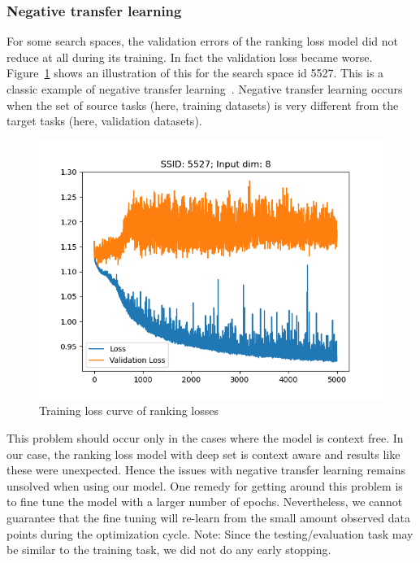 \documentclass[12pt, twoside, ngerman]{report}
\begin{document}
\subsubsection{Negative transfer learning}
\label{sec:NegativeTransferLearning}
For some search spaces,  the validation errors of the ranking loss model did not reduce at all during its training.
In fact the validation loss became worse.
Figure~\ref{fig:NegativeLearning} shows an illustration of this for the search space id 5527.
This is a classic example of negative transfer learning~\cite{Weiss2016}.
Negative transfer learning occurs when the set of source tasks (here,  training datasets) is very different from the target tasks (here, validation datasets).

\begin{figure}[htb]
  \centering
    \includegraphics[scale=0.5]{images/NegativeLearning}
    \caption{Training loss curve of ranking losses}
    \label{fig:NegativeLearning}
\end{figure}

This problem should occur only in the cases where the model is context free.
In our case,  the ranking loss model with deep set is context aware and results like these were unexpected.
Hence the issues with negative transfer learning remains unsolved when using our model.
One remedy for getting around this problem is to fine tune the model with a larger number of epochs.
Nevertheless,  we cannot guarantee that the fine tuning will re-learn from the small amount observed data points during the optimization cycle.
Note: Since the testing/evaluation task may be similar to the training task,  we did not do any early stopping.
\end{document}
